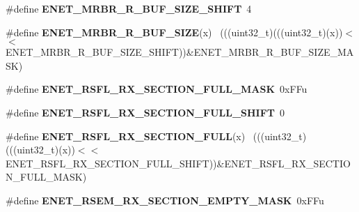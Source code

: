 \begin{DoxyCompactItemize}
\item 
\hypertarget{group___e_n_e_t___register___masks_ga97d12f7cd393b851484d3bbdcd4614b2}{}\#define {\bfseries E\+N\+E\+T\+\_\+\+M\+R\+B\+R\+\_\+\+R\+\_\+\+B\+U\+F\+\_\+\+S\+I\+Z\+E\+\_\+\+S\+H\+I\+F\+T}~4\label{group___e_n_e_t___register___masks_ga97d12f7cd393b851484d3bbdcd4614b2}

\item 
\hypertarget{group___e_n_e_t___register___masks_ga8bdf2e3790747a8835aeadf5d8f26c09}{}\#define {\bfseries E\+N\+E\+T\+\_\+\+M\+R\+B\+R\+\_\+\+R\+\_\+\+B\+U\+F\+\_\+\+S\+I\+Z\+E}(x)                                ~(((uint32\+\_\+t)(((uint32\+\_\+t)(x))$<$$<$E\+N\+E\+T\+\_\+\+M\+R\+B\+R\+\_\+\+R\+\_\+\+B\+U\+F\+\_\+\+S\+I\+Z\+E\+\_\+\+S\+H\+I\+F\+T))\&E\+N\+E\+T\+\_\+\+M\+R\+B\+R\+\_\+\+R\+\_\+\+B\+U\+F\+\_\+\+S\+I\+Z\+E\+\_\+\+M\+A\+S\+K)\label{group___e_n_e_t___register___masks_ga8bdf2e3790747a8835aeadf5d8f26c09}

\item 
\hypertarget{group___e_n_e_t___register___masks_ga415bf81c3a615e8ee3c7cd5dddc5a9a2}{}\#define {\bfseries E\+N\+E\+T\+\_\+\+R\+S\+F\+L\+\_\+\+R\+X\+\_\+\+S\+E\+C\+T\+I\+O\+N\+\_\+\+F\+U\+L\+L\+\_\+\+M\+A\+S\+K}~0x\+F\+Fu\label{group___e_n_e_t___register___masks_ga415bf81c3a615e8ee3c7cd5dddc5a9a2}

\item 
\hypertarget{group___e_n_e_t___register___masks_ga8d10ff4a7b7abbe2f089ccc4dddcdd46}{}\#define {\bfseries E\+N\+E\+T\+\_\+\+R\+S\+F\+L\+\_\+\+R\+X\+\_\+\+S\+E\+C\+T\+I\+O\+N\+\_\+\+F\+U\+L\+L\+\_\+\+S\+H\+I\+F\+T}~0\label{group___e_n_e_t___register___masks_ga8d10ff4a7b7abbe2f089ccc4dddcdd46}

\item 
\hypertarget{group___e_n_e_t___register___masks_ga9fb89ab2bc316d9d08a7e6ac27bfaa20}{}\#define {\bfseries E\+N\+E\+T\+\_\+\+R\+S\+F\+L\+\_\+\+R\+X\+\_\+\+S\+E\+C\+T\+I\+O\+N\+\_\+\+F\+U\+L\+L}(x)                      ~(((uint32\+\_\+t)(((uint32\+\_\+t)(x))$<$$<$E\+N\+E\+T\+\_\+\+R\+S\+F\+L\+\_\+\+R\+X\+\_\+\+S\+E\+C\+T\+I\+O\+N\+\_\+\+F\+U\+L\+L\+\_\+\+S\+H\+I\+F\+T))\&E\+N\+E\+T\+\_\+\+R\+S\+F\+L\+\_\+\+R\+X\+\_\+\+S\+E\+C\+T\+I\+O\+N\+\_\+\+F\+U\+L\+L\+\_\+\+M\+A\+S\+K)\label{group___e_n_e_t___register___masks_ga9fb89ab2bc316d9d08a7e6ac27bfaa20}

\item 
\hypertarget{group___e_n_e_t___register___masks_ga7efbed880ef6db92d0b5afa9584e4a55}{}\#define {\bfseries E\+N\+E\+T\+\_\+\+R\+S\+E\+M\+\_\+\+R\+X\+\_\+\+S\+E\+C\+T\+I\+O\+N\+\_\+\+E\+M\+P\+T\+Y\+\_\+\+M\+A\+S\+K}~0x\+F\+Fu\label{group___e_n_e_t___register___masks_ga7efbed880ef6db92d0b5afa9584e4a55}


\end{DoxyCompactItemize}
